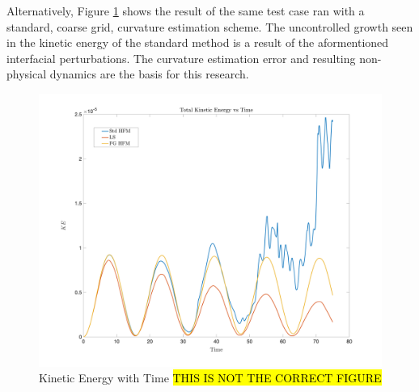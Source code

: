 Alternatively, Figure \ref{fig:stdKE} shows the result of the same test case ran with a standard, coarse grid, curvature estimation scheme. The uncontrolled growth seen in the kinetic energy of the standard method is a result of the aformentioned interfacial perturbations. The curvature estimation error and resulting non-physical dynamics are the basis for this research. 
\begin{figure}[h]
	\centering
	\includegraphics[width=5.0in]{figs/KEvT}
	\caption{Kinetic Energy with Time \hl{THIS IS NOT THE CORRECT FIGURE}}
	\label{fig:stdKE}
\end{figure}